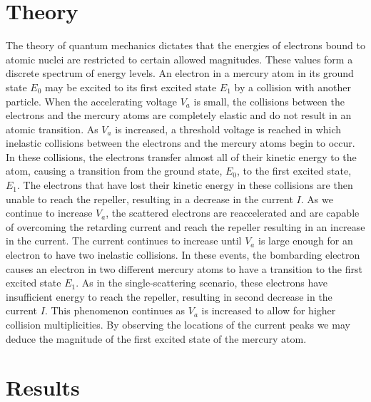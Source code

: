 \documentclass[aps, reprint,amsmath,amssymb]{revtex4-1} %
\begin{document}
\section{Theory}

The theory of quantum mechanics dictates that the energies of electrons bound to atomic nuclei are restricted to certain allowed magnitudes. These values form a discrete spectrum of energy levels. An electron in a mercury atom in its ground state $E_0$ may be excited to its first excited state $E_1$ by a collision with another particle. When the accelerating voltage $V_a$ is small, the collisions between the electrons and the mercury atoms are completely elastic and do not result in an atomic transition. As $V_a$ is increased, a threshold voltage is reached in which inelastic collisions between the electrons and the mercury atoms begin to occur. In these collisions, the electrons transfer almost all of their kinetic energy to the atom, causing a transition from the ground state, $E_0$, to the first excited state, $E_1$. The electrons that have lost their kinetic energy in these collisions are then unable to reach the repeller, resulting in a decrease in the current $I$. As we continue to increase $V_a$, the scattered electrons are reaccelerated and are capable of overcoming the retarding current and reach the repeller resulting in an increase in the current. The current continues to increase until $V_a$ is large enough for an electron to have two inelastic collisions. In these events, the bombarding electron causes an electron in two different mercury atoms to have a transition to the first excited state $E_1$. As in the single-scattering scenario, these electrons have insufficient energy to reach the repeller, resulting in second decrease in the current $I$. This phenomenon continues as $V_a$ is increased to allow for higher collision multiplicities. By observing the locations of the current peaks we may deduce the magnitude of the first excited state of the mercury atom.

\section{Results}
\end{document}
